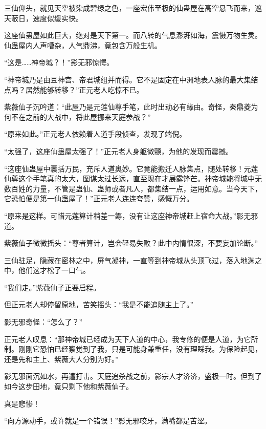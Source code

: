 \begin{this_body}
三仙仰头，就见天空被染成碧绿之色，一座宏伟至极的仙蛊屋在高空悬飞而来，遮天蔽日，速度似缓实快。

这座仙蛊屋如此巨大，绝对是天下第一。而八转的气息澎湃如海，震慑万物生灵。仙蛊屋内人声嘈杂，人气鼎沸，竟包含万般生机。

“这是……神帝城？！”影无邪惊愕。

“神帝城乃是由豆神宫、帝君城组并而得。它不是固定在中洲地表人脉的最大集结点吗？居然能够转移？”正元老人吃惊不已。

紫薇仙子沉吟道：“此屋乃是元莲仙尊手笔，此时出动必有缘由。奇怪，秦鼎菱为何不在之前的大战中，将此屋挪来天庭参战？”

“原来如此。”正元老人依赖着人道手段侦查，发现了端倪。

“太强了，这座仙蛊屋太强了！”正元老人身躯微颤，为他的发现而震撼。

“这座仙蛊屋中囊括万民，充斥人道奥妙。它竟能搬迁人脉集点，随处转移！元莲仙尊这个手笔真的太大，图谋太过长远，直至现在才展露锋芒。神帝城能将城中无数百姓的力量，不管是蛊仙、蛊师或者凡人，都集结一点，运用如意。当今天下，它恐怕便是第一仙蛊屋了！”正元老人连连夸赞，感慨万分。

“原来是这样。可惜元莲算计稍差一筹，没有让这座神帝城赶上宿命大战。”影无邪道。

紫薇仙子微微摇头：“尊者算计，岂会轻易失败？此中内情很深，不要妄加论断。”

三仙驻足，隐藏在密林之中，屏气凝神，一直等到神帝城从头顶飞过，落入地渊之中，他们这才松了一口气。

“我们走。”紫薇仙子正要启程。

但正元老人却停留原地，苦笑摇头：“我是不能追随主上了。”

影无邪奇怪：“怎么了？”

正元老人叹息：“那神帝城已经成为天下人道的中心，我专修的便是人道，为它所制。刚刚它恐怕已经察觉到了我，只是可能身兼重任，没有理睬我。为保险起见，还是先和主上、紫薇大人分别为好。”

影无邪面沉如水，再遭打击。天庭追杀战之前，影宗人才济济，盛极一时。但到了如今这步田地，竟只剩下他和紫薇仙子。

真是悲惨！

“向方源动手，或许就是一个错误！”影无邪咬牙，满嘴都是苦涩。

\end{this_body}

